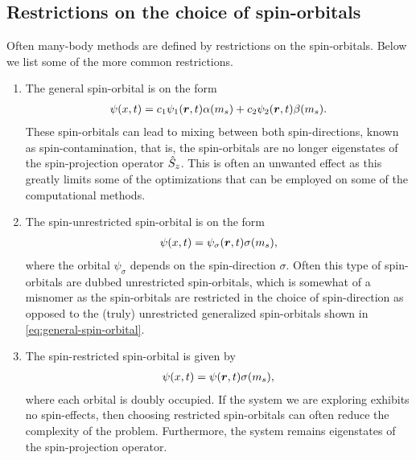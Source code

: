         \subsection{Restrictions on the choice of spin-orbitals}
            \label{subsec:restrictions-on-spin-orbitals}
            Often many-body methods are defined by restrictions on the
            spin-orbitals.
            Below we list some of the more common restrictions.
            \begin{enumerate}
                \item The general spin-orbital is on the form
                    \begin{align}
                        \psi(x, t)
                        = c_1\psi_1(\boldsymbol{r}, t) \alpha(m_s)
                        + c_2\psi_2(\boldsymbol{r}, t) \beta(m_s).
                        \label{eq:general-spin-orbital}
                    \end{align}
                    These spin-orbitals can lead to mixing between both
                    spin-directions, known as spin-contamination, that is, the
                    spin-orbitals are no longer eigenstates of the
                    spin-projection operator $\hat{S}_{z}$.
                    This is often an unwanted effect as this greatly limits some
                    of the optimizations that can be employed on some of the
                    computational methods.
                \item The spin-unrestricted spin-orbital is on the form
                    \begin{align}
                        \psi(x, t)
                        = \psi_{\sigma}(\boldsymbol{r}, t) \sigma(m_s),
                        \label{eq:unrestricted-spin-orbital}
                    \end{align}
                    where the orbital $\psi_{\sigma}$ depends on the
                    spin-direction $\sigma$.
                    Often this type of spin-orbitals are dubbed unrestricted
                    spin-orbitals, which is somewhat of a misnomer as the
                    spin-orbitals are restricted in the choice of spin-direction
                    as opposed to the (truly) unrestricted generalized
                    spin-orbitals shown in \autoref{eq:general-spin-orbital}.
                \item The spin-restricted spin-orbital is given by
                    \begin{align}
                        \psi(x, t)
                        = \psi(\boldsymbol{r}, t) \sigma(m_s),
                        \label{eq:restricted-spin-orbital}
                    \end{align}
                    where each orbital is doubly occupied.
                    If the system we are exploring exhibits no spin-effects,
                    then choosing restricted spin-orbitals can often reduce the
                    complexity of the problem.
                    Furthermore, the system remains eigenstates of the
                    spin-projection operator.
            \end{enumerate}



